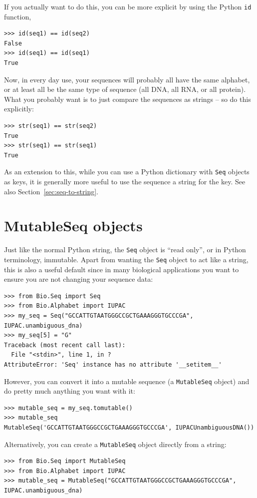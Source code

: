\documentclass{report}
\begin{document}
If you actually want to do this, you can be more explicit by using the Python
\verb|id| function,
\begin{verbatim}
>>> id(seq1) == id(seq2)
False
>>> id(seq1) == id(seq1)
True
\end{verbatim}

Now, in every day use, your sequences will probably all have the same
alphabet, or at least all be the same type of sequence (all DNA, all RNA, or
all protein). What you probably want is to just compare the sequences as
strings -- so do this explicitly:

\begin{verbatim}
>>> str(seq1) == str(seq2)
True
>>> str(seq1) == str(seq1)
True
\end{verbatim}

\noindent As an extension to this, while you can use a Python dictionary with
\verb|Seq| objects as keys, it is generally more useful to use the sequence a
string for the key. See also Section~\ref{sec:seq-to-string}.

\section{MutableSeq objects}
\label{sec:mutable-seq}

Just like the normal Python string, the \verb|Seq| object is ``read only'', or in Python terminology, immutable.  Apart from wanting the \verb|Seq| object to act like a string, this is also a useful default since in many biological applications you want to ensure you are not changing your sequence data:

\begin{verbatim}
>>> from Bio.Seq import Seq
>>> from Bio.Alphabet import IUPAC
>>> my_seq = Seq("GCCATTGTAATGGGCCGCTGAAAGGGTGCCCGA", IUPAC.unambiguous_dna)
>>> my_seq[5] = "G"
Traceback (most recent call last):
  File "<stdin>", line 1, in ?
AttributeError: 'Seq' instance has no attribute '__setitem__'
\end{verbatim}

However, you can convert it into a mutable sequence (a \verb|MutableSeq| object) and do pretty much anything you want with it:

\begin{verbatim}
>>> mutable_seq = my_seq.tomutable()
>>> mutable_seq
MutableSeq('GCCATTGTAATGGGCCGCTGAAAGGGTGCCCGA', IUPACUnambiguousDNA())
\end{verbatim}

Alternatively, you can create a \verb|MutableSeq| object directly from a string:
\begin{verbatim}
>>> from Bio.Seq import MutableSeq
>>> from Bio.Alphabet import IUPAC
>>> mutable_seq = MutableSeq("GCCATTGTAATGGGCCGCTGAAAGGGTGCCCGA", IUPAC.unambiguous_dna)
\end{verbatim}
\end{document}
